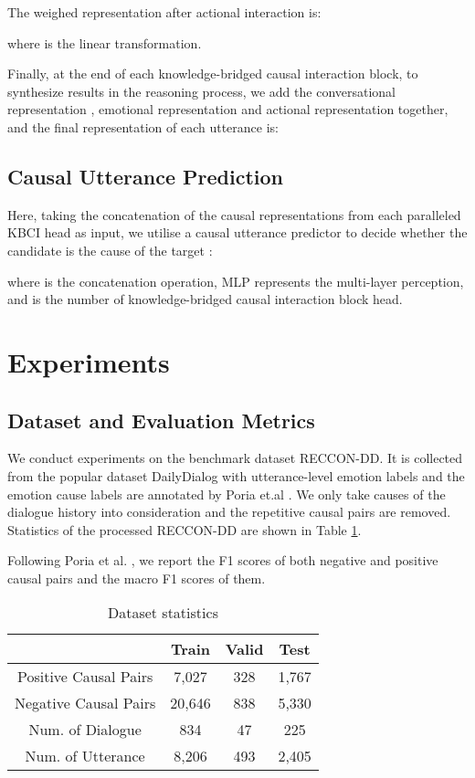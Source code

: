 \documentclass[letterpaper]{article} \usepackage{aaai23}  \usepackage{times}  \usepackage{helvet}  \usepackage{courier}  \usepackage[hyphens]{url}  \usepackage{graphicx} \urlstyle{rm} \def\UrlFont{\rm}  \usepackage{natbib}  \usepackage{caption} \frenchspacing  \setlength{\pdfpagewidth}{8.5in} \setlength{\pdfpageheight}{11in} \usepackage{algorithm}
\begin{document}
The weighed representation after actional interaction is:

where  is the linear transformation.

Finally, at the end of each knowledge-bridged causal interaction block, to synthesize results in the reasoning process, we add the conversational representation , emotional representation  and actional representation  together, and the final representation of each utterance is:


\subsection{Causal Utterance Prediction}
Here, taking the concatenation of the causal representations from each paralleled KBCI head as input, we utilise a causal utterance predictor to decide whether the candidate  is the cause of the target :

where  is the concatenation operation, MLP represents the multi-layer perception, and  is the number of knowledge-bridged causal interaction block head.

\section{Experiments}
\subsection{Dataset and Evaluation Metrics}
We conduct experiments on the benchmark dataset RECCON-DD. It is collected from the popular dataset DailyDialog \cite{dd} with utterance-level emotion labels and the emotion cause labels are annotated by Poria et.al . We only take causes of the dialogue history into consideration and the repetitive causal pairs are removed. Statistics of the processed RECCON-DD are shown in Table \ref{tab1}.

Following Poria et al. , we report the F1 scores of both negative and positive causal pairs and the macro F1 scores of them.

\begin{table}
\footnotesize
\centering
\begin{tabular}{cccc}
\toprule
& \textbf{Train} & \textbf{Valid} & \textbf{Test} \\
\midrule
Positive Causal Pairs &7,027 &328 &1,767 \\
Negative Causal Pairs &20,646 &838 &5,330 \\
Num. of Dialogue &834 &47 &225 \\
Num. of Utterance &8,206 &493 &2,405\\
\bottomrule
\end{tabular}
\caption{Dataset statistics}
\label{tab1}
\end{table}
\end{document}
